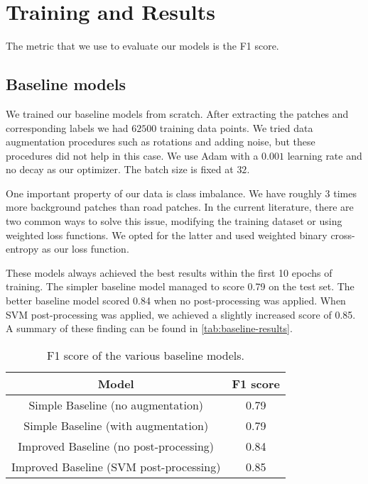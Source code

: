 \section{Training and Results}
The metric that we use to evaluate our models is the F1 score.

\subsection{Baseline models} \label{subsec:training-baselines}
We trained our baseline models from scratch. After extracting the patches and corresponding labels we had $62500$ training data points. We tried data augmentation procedures such as rotations and adding noise, but these procedures did not help in this case. We use Adam with a $0.001$ learning rate and no decay as our optimizer. The batch size is fixed at $32$.

One important property of our data is class imbalance. We have roughly $3$ times more background patches than road patches. In the current literature, there are two common ways to solve this issue, modifying the training dataset or using weighted loss functions. We opted for the latter and used weighted binary cross-entropy as our loss function.

These models always achieved the best results within the first 10 epochs of training. The simpler baseline model managed to score 0.79 on the test set. The better baseline model scored 0.84 when no post-processing was applied. When SVM post-processing was applied, we achieved a slightly increased score of 0.85. A summary of these finding can be found in \autoref{tab:baseline-results}.

\begin{table}[h]
    \centering
    \begin{tabular}{|c|c|}
        \hline
        \textbf{Model} & \textbf{F1 score} \\
        \hline
        \hline
        Simple Baseline (no augmentation) & 0.79 \\
        \hline
        Simple Baseline (with augmentation) & 0.79 \\
        \hline
        Improved Baseline (no post-processing) & 0.84 \\
        \hline
        Improved Baseline (SVM post-processing) & 0.85 \\
        \hline
    \end{tabular}
    \caption{F1 score of the various baseline models.}
    \label{tab:baseline-results}
\end{table}

